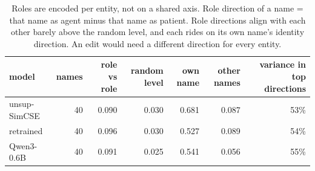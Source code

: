 \begin{table}[t]
\centering
\small
\caption{Roles are encoded per entity, not on a shared axis. Role direction of a name = that name as agent minus that name as patient. Role directions align with each other barely above the random level, and each rides on its own name's identity direction. An edit would need a different direction for every entity.}
\begin{tabular}{lrrrrrr}
\toprule
model & names & role vs role & random level & own name & other names & variance in top directions \\
\midrule
unsup-SimCSE & 40 & 0.090 & 0.030 & 0.681 & 0.087 & 53\% \\
retrained & 40 & 0.096 & 0.030 & 0.527 & 0.089 & 54\% \\
Qwen3-0.6B & 40 & 0.091 & 0.025 & 0.541 & 0.056 & 55\% \\
\bottomrule
\end{tabular}
\end{table}

